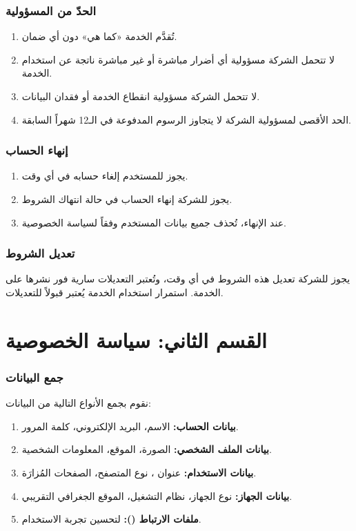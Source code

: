 \documentclass[11pt,a4paper]{article}
\begin{document}
\section{الحدّ من المسؤولية}
\label{sec:liability}
\begin{enumerate}
    \item تُقدَّم الخدمة «كما هي» دون أي ضمان.
    \item لا تتحمل الشركة مسؤولية أي أضرار مباشرة أو غير مباشرة ناتجة عن استخدام الخدمة.
    \item لا تتحمل الشركة مسؤولية انقطاع الخدمة أو فقدان البيانات.
    \item الحد الأقصى لمسؤولية الشركة لا يتجاوز الرسوم المدفوعة في الـ12 شهراً السابقة.
\end{enumerate}

\section{إنهاء الحساب}
\label{sec:termination}
\begin{enumerate}
    \item يجوز للمستخدم إلغاء حسابه في أي وقت.
    \item يجوز للشركة إنهاء الحساب في حالة انتهاك الشروط.
    \item عند الإنهاء، تُحذف جميع بيانات المستخدم وفقاً لسياسة الخصوصية.
\end{enumerate}

\section{تعديل الشروط}
\label{sec:amendments}
يجوز للشركة تعديل هذه الشروط في أي وقت، وتُعتبر التعديلات سارية فور نشرها على الخدمة. استمرار استخدام الخدمة يُعتبر قبولاً للتعديلات.

\newpage
\part*{القسم الثاني: سياسة الخصوصية}

\section{جمع البيانات}
\label{sec:data_collection}
نقوم بجمع الأنواع التالية من البيانات:
\begin{enumerate}
    \item \textbf{بيانات الحساب:} الاسم، البريد الإلكتروني، كلمة المرور.
    \item \textbf{بيانات الملف الشخصي:} الصورة، الموقع، المعلومات الشخصية.
    \item \textbf{بيانات الاستخدام:} عنوان ، نوع المتصفح، الصفحات المُزارَة.
    \item \textbf{بيانات الجهاز:} نوع الجهاز، نظام التشغيل، الموقع الجغرافي التقريبي.
    \item \textbf{ملفات الارتباط ():} لتحسين تجربة الاستخدام.
\end{enumerate}
\end{document}
